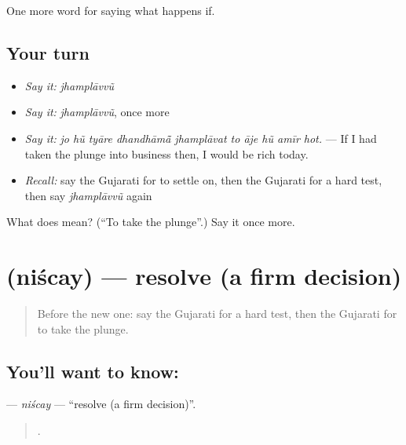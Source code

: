 \begin{grammarlens}[title={What you've built}]
One more word for saying what happens if.
\end{grammarlens}

\subsection*{Your turn}
\begin{itemize}
\raggedright
  \item \emph{Say it:} \emph{jhamplāvvũ}
  \item \emph{Say it:} \emph{jhamplāvvũ}, once more
  \item \emph{Say it:} \emph{jo hũ tyāre dhandhāmā̃ jhamplāvat to āje hũ amīr hot.} — If I had taken the plunge into business then, I would be rich today.
  \item \emph{Recall:} say the Gujarati for to settle on, then the Gujarati for a hard test, then say \emph{jhamplāvvũ} again
\end{itemize}

\begin{tcolorbox}[breakable,colback=teal!4,colframe=teal!35!black,title={Before you move on}]
What does  mean? (\textquotedblleft{}To take the plunge\textquotedblright{}.) Say it once more.
\end{tcolorbox}
\section[\texorpdfstring{\gu{નિશ્ચય} (niścay)}{નિશ્ચય (niścay)}]{ (niścay) — resolve (a firm decision)}

\label{lesson:GU-C539-niscay}



\begin{quote}
Before the new one: say the Gujarati for a hard test, then the Gujarati for to take the plunge.
\end{quote}

\subsection*{You'll want to know: }
\textbf{} — \emph{niścay} — \textquotedblleft{}resolve (a firm decision)\textquotedblright{}.

\begin{quote}
          .
\end{quote}

